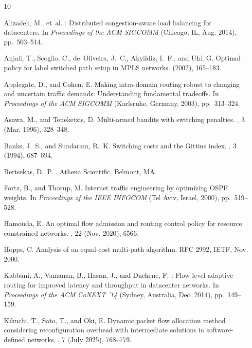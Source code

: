 \documentclass{amsart}
\begin{document}
\begin{thebibliography}{10}

{\sc Alizadeh, M., et~al.}
: Distributed congestion-aware load balancing for datacenters.
\newblock In {\em Proceedings of the ACM SIGCOMM\/} (Chicago, IL, Aug. 2014),
  pp.~503--514.

{\sc Anjali, T., Scoglio, C., de~Oliveira, J.~C., Akyildiz, I.~F., and Uhl, G.}
\newblock Optimal policy for label switched path setup in {MPLS} networks.
 (2002), 165--183.

{\sc Applegate, D., and Cohen, E.}
\newblock Making intra-domain routing robust to changing and uncertain traffic
  demands: Understanding fundamental tradeoffs.
\newblock In {\em Proceedings of the ACM SIGCOMM\/} (Karlsruhe, Germany, 2003),
  pp.~313--324.

{\sc Asawa, M., and Teneketzis, D.}
\newblock Multi-armed bandits with switching penalties.
, 3 (Mar. 1996),
  328--348.

{\sc Banks, J.~S., and Sundaram, R.~K.}
\newblock Switching costs and the {Gittins} index.
, 3 (1994), 687--694.

{\sc Bertsekas, D.~P.}
.
\newblock Athena Scientific, Belmont, MA.

{\sc Fortz, B., and Thorup, M.}
\newblock Internet traffic engineering by optimizing {OSPF} weights.
\newblock In {\em Proceedings of the IEEE INFOCOM\/} (Tel Aviv, Israel, 2000),
  pp.~519--528.

{\sc Hamouda, E.}
\newblock An optimal flow admission and routing control policy for resource
  constrained networks.
, 22 (Nov. 2020), 6566.

{\sc Hopps, C.}
\newblock Analysis of an equal-cost multi-path algorithm.
\newblock RFC 2992, IETF, Nov. 2000.

{\sc Kabbani, A., Vamanan, B., Hasan, J., and Duchene, F.}
: Flow-level adaptive routing for improved latency and
  throughput in datacenter networks.
\newblock In {\em Proceedings of the ACM CoNEXT '14\/} (Sydney, Australia, Dec.
  2014), pp.~149--159.

{\sc Kikuchi, T., Sato, T., and Oki, E.}
\newblock Dynamic packet flow allocation method considering reconfiguration
  overhead with intermediate solutions in software-defined networks.
, 7 (July 2025),
  768--779.


\end{thebibliography}
\end{document}

